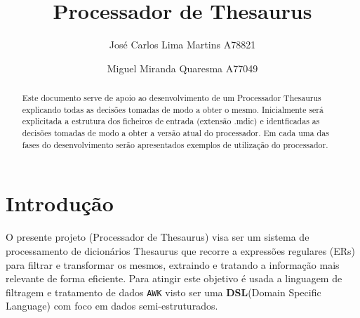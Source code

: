 \documentclass{llncs}
\begin{document}
 \mainmatter
\title{Processador de Thesaurus}
\author{José Carlos Lima Martins A78821 \and
        Miguel Miranda Quaresma A77049}

\maketitle

\justify

\begin{abstract}
Este documento serve de apoio ao desenvolvimento de um Processador Thesaurus explicando todas as decisões tomadas de modo a obter o mesmo. Inicialmente será explicitada a estrutura dos ficheiros de entrada (extensão .mdic) e identficadas as decisões tomadas de modo a obter a versão atual do processador. Em cada uma das fases do desenvolvimento serão apresentados exemplos de utilização do processador.
\end{abstract}

\section{Introdução}
O presente projeto (Processador de Thesaurus) visa ser um sistema de processamento de dicionários Thesaurus que recorre a expressões regulares (ERs) para filtrar e transformar os mesmos, extraindo e tratando a informação mais relevante de forma eficiente. Para atingir este objetivo é usada a linguagem de filtragem e tratamento de dados \texttt{AWK} visto ser uma \textbf{DSL}(Domain Specific Language) com foco em dados semi-estruturados.
\end{document}
